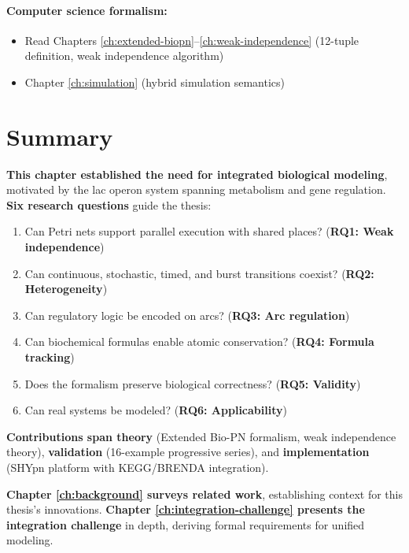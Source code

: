 \paragraph{Computer science formalism:}
\begin{itemize}
    \item Read Chapters \ref{ch:extended-biopn}--\ref{ch:weak-independence} (12-tuple definition, weak independence algorithm)
    \item Chapter \ref{ch:simulation} (hybrid simulation semantics)
\end{itemize}

\section{Summary}
\label{sec:ch1-summary}

\textbf{This chapter established the need for integrated biological modeling}, motivated by the lac operon system spanning metabolism and gene regulation. \textbf{Six research questions} guide the thesis:

\begin{enumerate}
    \item Can Petri nets support parallel execution with shared places? (\textbf{RQ1: Weak independence})
    \item Can continuous, stochastic, timed, and burst transitions coexist? (\textbf{RQ2: Heterogeneity})
    \item Can regulatory logic be encoded on arcs? (\textbf{RQ3: Arc regulation})
    \item Can biochemical formulas enable atomic conservation? (\textbf{RQ4: Formula tracking})
    \item Does the formalism preserve biological correctness? (\textbf{RQ5: Validity})
    \item Can real systems be modeled? (\textbf{RQ6: Applicability})
\end{enumerate}

\textbf{Contributions span theory} (Extended Bio-PN formalism, weak independence theory), \textbf{validation} (16-example progressive series), and \textbf{implementation} (SHYpn platform with KEGG/BRENDA integration).

\textbf{Chapter \ref{ch:background} surveys related work}, establishing context for this thesis's innovations. \textbf{Chapter \ref{ch:integration-challenge} presents the integration challenge} in depth, deriving formal requirements for unified modeling.
